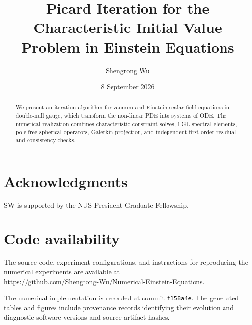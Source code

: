 \documentclass[11pt]{article}
\title{Picard Iteration for the Characteristic Initial Value Problem in Einstein Equations}
\author{Shengrong Wu}
\date{8 September 2026}
\begin{document}
\maketitle
\begin{abstract}
    We present an iteration algorithm for vacuum and
    Einstein scalar-field equations in double-null gauge, which transform the non-linear PDE into systems of ODE. The numerical
    realization combines characteristic constraint solves, LGL spectral
    elements, pole-free spherical operators, Galerkin projection, and
    independent first-order residual and consistency checks.
\end{abstract}
\tableofcontents









\section*{Acknowledgments}
SW is supported by the NUS President Graduate Fellowship. 

\section*{Code availability}
The source code, experiment configurations, and instructions for reproducing
the numerical experiments are available at\\
\url{https://github.com/Shengrong-Wu/Numerical-Einstein-Equations}.

The numerical implementation is recorded at commit \texttt{f158a4e}.
The generated tables and figures include provenance records identifying
their evolution and diagnostic software versions and source-artifact hashes.



\end{document}
